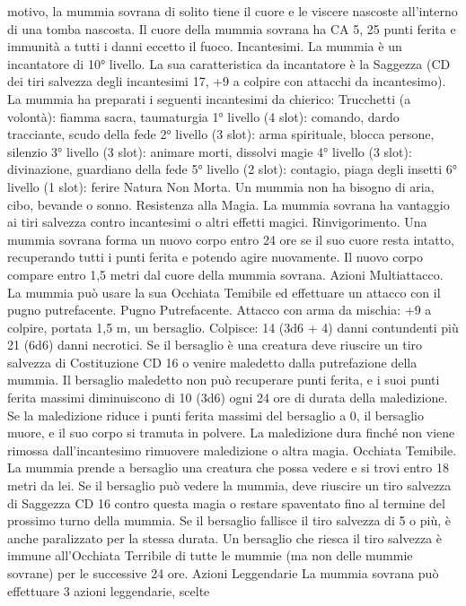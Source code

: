 \begin{multicols}{2}
motivo, la mummia sovrana di solito tiene il cuore e le viscere
nascoste all’interno di una tomba nascosta.
Il cuore della mummia sovrana ha CA 5, 25 punti ferita e
immunità a tutti i danni eccetto il fuoco.
Incantesimi. La mummia è un incantatore di 10° livello. La sua
caratteristica da incantatore è la Saggezza (CD dei tiri salvezza
degli incantesimi 17, +9 a colpire con attacchi da incantesimo).
La mummia ha preparati i seguenti incantesimi da chierico:
Trucchetti (a volontà): fiamma sacra, taumaturgia
1° livello (4 slot): comando, dardo tracciante, scudo della fede
2° livello (3 slot): arma spirituale, blocca persone, silenzio
3° livello (3 slot): animare morti, dissolvi magie
4° livello (3 slot): divinazione, guardiano della fede
5° livello (2 slot): contagio, piaga degli insetti
6° livello (1 slot): ferire
Natura Non Morta. Un mummia non ha bisogno di aria, cibo,
bevande o sonno.
Resistenza alla Magia. La mummia sovrana ha vantaggio ai tiri
salvezza contro incantesimi o altri effetti magici.
Rinvigorimento. Una mummia sovrana forma un nuovo corpo
entro 24 ore se il suo cuore resta intatto, recuperando tutti i punti
ferita e potendo agire nuovamente. Il nuovo corpo compare entro
1,5 metri dal cuore della mummia sovrana.
Azioni
Multiattacco. La mummia può usare la sua Occhiata Temibile ed
effettuare un attacco con il pugno putrefacente.
Pugno Putrefacente. Attacco con arma da mischia: +9 a colpire,
portata 1,5 m, un bersaglio.
Colpisce: 14 (3d6 + 4) danni contundenti più 21 (6d6) danni
necrotici. Se il bersaglio è una creatura deve riuscire un tiro
salvezza di Costituzione CD 16 o venire maledetto dalla
putrefazione della mummia. Il bersaglio maledetto non può
recuperare punti ferita, e i suoi punti ferita massimi diminuiscono
di 10 (3d6) ogni 24 ore di durata della maledizione. Se la
maledizione riduce i punti ferita massimi del bersaglio a 0, il
bersaglio muore, e il suo corpo si tramuta in polvere. La
maledizione dura finché non viene rimossa dall’incantesimo
rimuovere maledizione o altra magia.
Occhiata Temibile. La mummia prende a bersaglio una creatura
che possa vedere e si trovi entro 18 metri da lei. Se il bersaglio
può vedere la mummia, deve riuscire un tiro salvezza di
Saggezza CD 16 contro questa magia o restare spaventato fino al
termine del prossimo turno della mummia. Se il bersaglio fallisce
il tiro salvezza di 5 o più, è anche paralizzato per la stessa durata.
Un bersaglio che riesca il tiro salvezza è immune all’Occhiata
Terribile di tutte le mummie (ma non delle mummie sovrane) per
le successive 24 ore.
Azioni Leggendarie
La mummia sovrana può effettuare 3 azioni leggendarie, scelte

\end{multicols}
